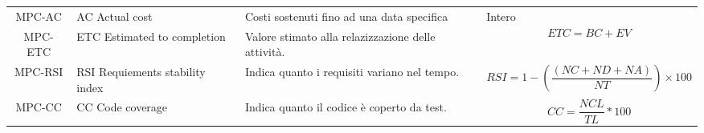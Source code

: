 \begin{table}[H]
\begin{tabular}{| c | p{3cm} | p{4cm} |p{7cm} | }
        MPC-AC                                                         & AC Actual cost                  & Costi sostenuti fino ad una data specifica                                                & Intero                                                                                  \\
        MPC-ETC                                                        & ETC Estimated to completion     & Valore stimato alla relazizzazione delle attività.                                        & \begin{equation}ETC = BC + EV       \end{equation}                                      \\
        MPC-RSI                                                        & RSI Requiements stability index & Indica quanto i requisiti variano nel tempo.                                              & \begin{equation}RSI = 1- \left( \frac{(NC + ND + NA)}{NT} \right) \times 100\end{equation} \\
        MPC-CC                                                         & CC Code coverage                & Indica quanto il codice è coperto da test.                                                & \begin{equation}CC = \frac{NCL}{TL} * 100\end{equation}                                 \\

        \hline
    \end{tabular}
\end{table}